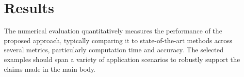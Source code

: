 
\chapter{Results}
\label{ch:results}

The numerical evaluation quantitatively measures the performance of the proposed approach, typically comparing it to state-of-the-art methods across several metrics, particularly computation time and accuracy. The selected examples should span a variety of application scenarios to robustly support the claims made in the main body.








